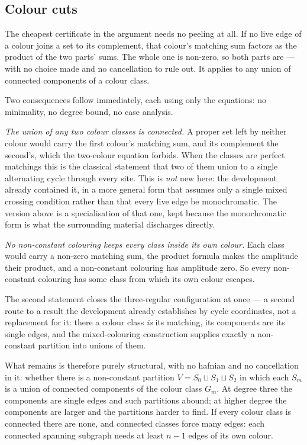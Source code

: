\documentclass[11pt]{article}
\theoremstyle{definition}
\theoremstyle{remark}
\begin{document}
\subsection*{Colour cuts}

The cheapest certificate in the argument needs no peeling at all. If no live edge of a
colour joins a set to its complement, that colour's matching sum factors as the product of
the two parts' sums. The whole one is non-zero, so both parts are --- with no choice made
and no cancellation to rule out. It applies to any union of connected components of a
colour class.

Two consequences follow immediately, each using only the equations: no minimality, no
degree bound, no case analysis.

\emph{The union of any two colour classes is connected.} A proper set left by neither
colour would carry the first colour's matching sum, and its complement the second's, which
the two-colour equation forbids. When the classes are perfect matchings this is the
classical statement that two of them union to a single alternating cycle through every
site. This is \emph{not} new here: the development already contained it, in a more general
form that assumes only a single mixed crossing condition rather than that every live edge be
monochromatic. The version above is a specialisation of that one, kept because the
monochromatic form is what the surrounding material discharges directly.

\emph{No non-constant colouring keeps every class inside its own colour.} Each class would
carry a non-zero matching sum, the product formula makes the amplitude their product, and a
non-constant colouring has amplitude zero. So every non-constant colouring has some class
from which its own colour escapes.

The second statement closes the three-regular configuration at once --- a second route to a
result the development already establishes by cycle coordinates, not a replacement for it:
there a colour class \emph{is} its matching, its components are its single edges, and the
mixed-colouring
construction supplies exactly a non-constant partition into unions of them.

What remains is therefore purely structural, with no hafnian and no cancellation in it:
whether there is a non-constant partition $V = S_0 \sqcup S_1 \sqcup S_2$ in which each
$S_m$ is a union of connected components of the colour class $G_m$. At degree three the
components are single edges and such partitions abound; at higher degree the components are
larger and the partitions harder to find. If every colour class is connected there are
none, and connected classes force many edges: each connected spanning subgraph needs at
least $n-1$ edges of its own colour.
\end{document}
